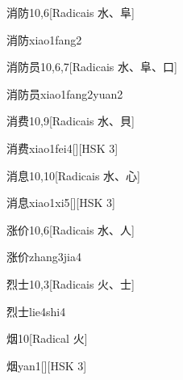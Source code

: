 \begin{entry}{消防}{10,6}[Radicais ⽔、⾩]
  \begin{phonetics}{消防}{xiao1fang2}
  \end{phonetics}
\end{entry}

\begin{entry}{消防员}{10,6,7}[Radicais ⽔、⾩、⼝]
  \begin{phonetics}{消防员}{xiao1fang2yuan2}
  \end{phonetics}
\end{entry}

\begin{entry}{消费}{10,9}[Radicais ⽔、⾙]
  \begin{phonetics}{消费}{xiao1fei4}[][HSK 3]
  \end{phonetics}
\end{entry}

\begin{entry}{消息}{10,10}[Radicais ⽔、⼼]
  \begin{phonetics}{消息}{xiao1xi5}[][HSK 3]
  \end{phonetics}
\end{entry}

\begin{entry}{涨价}{10,6}[Radicais ⽔、⼈]
  \begin{phonetics}{涨价}{zhang3jia4}
  \end{phonetics}
\end{entry}

\begin{entry}{烈士}{10,3}[Radicais ⽕、⼠]
  \begin{phonetics}{烈士}{lie4shi4}
  \end{phonetics}
\end{entry}

\begin{entry}{烟}{10}[Radical ⽕]
  \begin{phonetics}{烟}{yan1}[][HSK 3]
  \end{phonetics}
\end{entry}

